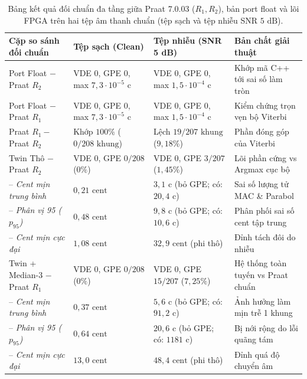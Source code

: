 \begin{table}[htbp]
\centering
\caption{Bảng kết quả đối chuẩn đa tầng giữa Praat 7.0.03 ($R_1, R_2$), bản port float và lõi FPGA trên hai tệp âm thanh chuẩn (tệp sạch và tệp nhiễu SNR $5\text{ dB}$).}
\label{tab:ch13_benchmark_golden}
\footnotesize
\begin{tabularx}{\linewidth}{>{\raggedright\arraybackslash}p{3.8cm}>{\raggedright\arraybackslash}p{3.3cm}>{\raggedright\arraybackslash}p{3.5cm}>{\raggedright\arraybackslash}X}
\toprule
\textbf{Cặp so sánh đối chuẩn} & \textbf{Tệp sạch (Clean)} & \textbf{Tệp nhiễu (SNR 5 dB)} & \textbf{Bản chất giải thuật} \\
\midrule
Port Float $-$ Praat $R_2$ & VDE 0, GPE 0, max $7{,}3\cdot 10^{-5}\text{ c}$ & VDE 0, GPE 0, max $1{,}5\cdot 10^{-4}\text{ c}$ & Khớp mã C++ tới sai số làm tròn \\
Port Float $-$ Praat $R_1$ & VDE 0, GPE 0, max $7{,}3\cdot 10^{-5}\text{ c}$ & VDE 0, GPE 0, max $1{,}5\cdot 10^{-4}\text{ c}$ & Kiểm chứng trọn vẹn bộ Viterbi \\
Praat $R_1 -$ Praat $R_2$ & Khớp $100\%$ ($0/208\text{ khung}$) & Lệch $19/207\text{ khung}$ ($9{,}18\%$) & Phần đóng góp của Viterbi \\
\midrule
Twin Thô $-$ Praat $R_2$ & VDE 0, GPE $0/208$ ($0\%$) & VDE 0, GPE $3/207$ ($1{,}45\%$) & Lõi phần cứng vs Argmax cục bộ \\
-- \emph{Cent mịn trung bình} & $0{,}21\text{ cent}$ & $3{,}1\text{ c}$ (bỏ GPE; có: $20{,}4\text{ c}$) & Sai số lượng tử MAC \& Parabol \\
-- \emph{Phân vị 95 ($p_{95}$)} & $0{,}48\text{ cent}$ & $9{,}8\text{ c}$ (bỏ GPE; có: $10{,}6\text{ c}$) & Phân phối sai số cent tập trung \\
-- \emph{Cent mịn cực đại} & $1{,}08\text{ cent}$ & $32{,}9\text{ cent}$ (phi thô) & Đỉnh tách đôi do nhiễu \\
\midrule
Twin + Median-3 $-$ Praat $R_1$ & VDE 0, GPE $0/208$ ($0\%$) & VDE 0, GPE $15/207$ ($7{,}25\%$) & Hệ thống toàn tuyến vs Praat chuẩn \\
-- \emph{Cent mịn trung bình} & $0{,}37\text{ cent}$ & $5{,}6\text{ c}$ (bỏ GPE; có: $91{,}2\text{ c}$) & Ảnh hưởng làm mịn trễ 1 khung \\
-- \emph{Phân vị 95 ($p_{95}$)} & $0{,}64\text{ cent}$ & $20{,}6\text{ c}$ (bỏ GPE; có: $1181\text{ c}$) & Bị nới rộng do lỗi quãng tám \\
-- \emph{Cent mịn cực đại} & $13{,}0\text{ cent}$ & $48{,}4\text{ cent}$ (phi thô) & Đỉnh quá độ chuyển âm \\

\end{tabularx}
\end{table}
